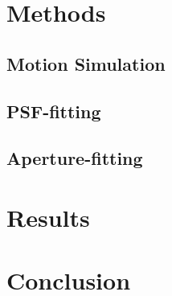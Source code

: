 \documentclass[12pt,preprint]{aastex}
\begin{document}
\section{Methods}

\subsection{Motion Simulation}

\subsection{PSF-fitting}

\subsection{Aperture-fitting}

\section{Results}

\section{Conclusion}
\end{document}
